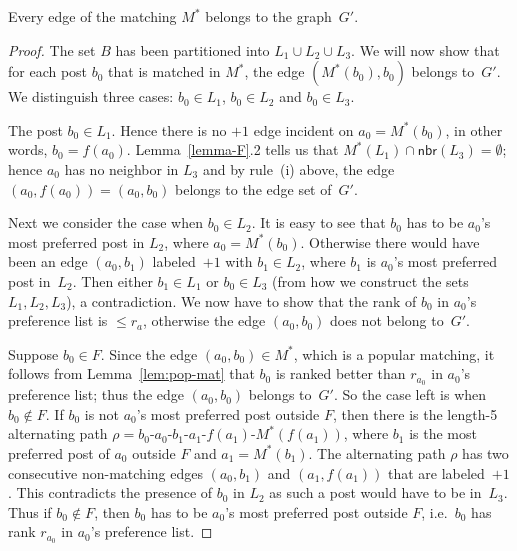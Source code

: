 \documentclass[11pt]{llncs}
\newcommand{\Nbr}{\mathsf{nbr}}
\begin{document}
\begin{lemma}
\label{lem:main}
Every edge of the matching $M^*$ belongs to the graph~$G'$.
\end{lemma}
\begin{proof}
The set $B$ has been partitioned into $L_1 \cup L_2 \cup L_3$. We will now show that for each post $b_0$ that is matched in $M^*$, the edge $(M^*(b_0),b_0)$ belongs to~$G'$. We distinguish three cases: $b_0 \in L_1$, $b_0 \in L_2$ and $b_0 \in L_3$.

\smallskip

 The post $b_0 \in L_1$. Hence there is no $+1$ edge incident on 
$a_0 = M^*(b_0)$, in other words, $b_0 = f(a_0)$.
Lemma~\ref{lemma-F}.2 tells us that $M^*(L_1) \cap \Nbr(L_3) = \emptyset$; 
hence $a_0$ has no neighbor in $L_3$ and by rule~(i) above, 
the edge $(a_0,f(a_0)) = (a_0,b_0)$ belongs to the edge set of~$G'$.


\smallskip

 Next we consider the case when $b_0 \in L_2$.
It is easy to see that $b_0$ has to be $a_0$'s most preferred post in $L_2$, where 
$a_0 = M^*(b_0)$. 
Otherwise there would have been an edge $(a_0,b_1)$ labeled~$+1$ with $b_1 \in L_2$, 
where $b_1$ is $a_0$'s most preferred post in~$L_2$. Then either $b_1 \in L_1$ or
$b_0 \in L_3$ (from how we construct the sets $L_1, L_2, L_3$), a contradiction.
We now have to show that the rank of $b_0$ in $a_0$'s preference list is $\le r_a$, 
otherwise the edge $(a_0,b_0)$ does not belong to~$G'$.

Suppose $b_0 \in F$. Since the edge $(a_0,b_0) \in M^*$, which is a popular matching, it follows 
from Lemma~\ref{lem:pop-mat} that $b_0$ is ranked better than $r_{a_0}$ in $a_0$'s preference 
list; thus the edge $(a_0,b_0)$ belongs to~$G'$. So the case left is when $b_0 \notin F$. 
If $b_0$ is not $a_0$'s most preferred post outside $F$, then there is the length-5 alternating 
path $\rho =b_0$-$a_0$-$b_1$-$a_1$-$f(a_1)$-$M^*(f(a_1))$, 
where $b_1$ is the most preferred post of $a_0$ outside $F$ and $a_1 = M^*(b_1)$.
The alternating path $\rho$ has two consecutive non-matching edges $(a_0,b_1)$ and 
$(a_1,f(a_1))$ that are labeled~$+1$. This contradicts the presence of $b_0$ in $L_2$ as such 
a post would have to be in~$L_3$.
Thus if $b_0 \notin F$, then $b_0$ has to be $a_0$'s most preferred post outside $F$, i.e.\
$b_0$ has rank $r_{a_0}$ in $a_0$'s preference list.

\smallskip


\end{proof}
\end{document}
